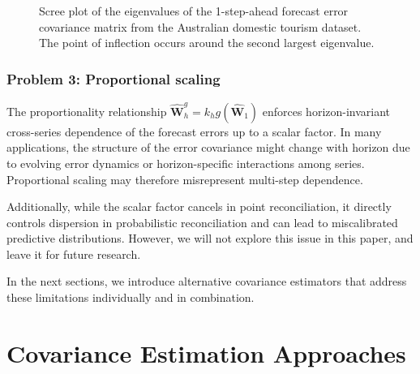 \documentclass[
  11pt,
  letterpaper,
  DIV=11,
  numbers=noendperiod,
  titlepage]{scrartcl}
\begin{document}
\begin{figure}


\caption{\label{fig-eigen}Scree plot of the eigenvalues of the
1-step-ahead forecast error covariance matrix from the Australian
domestic tourism dataset. The point of inflection occurs around the
second largest eigenvalue.}

\end{figure}%

\subsubsection*{Problem 3: Proportional scaling}\label{prob3}

The proportionality relationship
\(\hat{\boldsymbol{W}}^g_h = k_h g( \hat{\boldsymbol{W}}_1 )\) enforces
horizon-invariant cross-series dependence of the forecast errors up to a
scalar factor. In many applications, the structure of the error
covariance might change with horizon due to evolving error dynamics or
horizon-specific interactions among series. Proportional scaling may
therefore misrepresent multi-step dependence.

Additionally, while the scalar factor cancels in point reconciliation,
it directly controls dispersion in probabilistic reconciliation and can
lead to miscalibrated predictive distributions. However, we will not
explore this issue in this paper, and leave it for future research.

In the next sections, we introduce alternative covariance estimators
that address these limitations individually and in combination.

\section{Covariance Estimation Approaches}\label{sec-cov-est}
\end{document}
